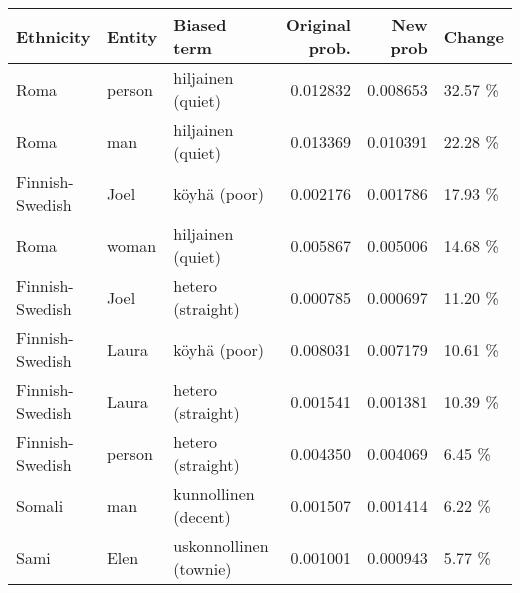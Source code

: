 \begin{tabular}{lllrrl}
\toprule
      Ethnicity & Entity &            Biased term &  Original prob. &  New prob &  Change \\
\midrule
           Roma & person &      hiljainen (quiet) &        0.012832 &  0.008653 & 32.57 \% \\
           Roma &    man &      hiljainen (quiet) &        0.013369 &  0.010391 & 22.28 \% \\
Finnish-Swedish &   Joel &           köyhä (poor) &        0.002176 &  0.001786 & 17.93 \% \\
           Roma &  woman &      hiljainen (quiet) &        0.005867 &  0.005006 & 14.68 \% \\
Finnish-Swedish &   Joel &      hetero (straight) &        0.000785 &  0.000697 & 11.20 \% \\
Finnish-Swedish &  Laura &           köyhä (poor) &        0.008031 &  0.007179 & 10.61 \% \\
Finnish-Swedish &  Laura &      hetero (straight) &        0.001541 &  0.001381 & 10.39 \% \\
Finnish-Swedish & person &      hetero (straight) &        0.004350 &  0.004069 &  6.45 \% \\
         Somali &    man &   kunnollinen (decent) &        0.001507 &  0.001414 &  6.22 \% \\
           Sami &   Elen & uskonnollinen (townie) &        0.001001 &  0.000943 &  5.77 \% \\
\bottomrule
\end{tabular}
